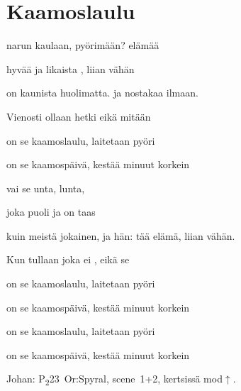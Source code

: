 \documentclass[12pt,a4paper]{article}
\begin{document}
\thispagestyle{empty}
\section*{Kaamoslaulu}


\begin{SBVerse}
 narun kaulaan,  pyörimään?
 elämää 

hyvää ja  likaista , liian vähän

 on kaunista  huolimatta.   ja
nostakaa  ilmaan.

Vienosti  ollaan hetki  eikä mitään
\end{SBVerse}

\begin{SBChorus}
 on se kaamoslaulu,  laitetaan
 pyöri

 on se kaamospäivä,  kestää 
minuut korkein
\end{SBChorus}

\begin{SBVerse}
  vai  se unta,
 lunta,

joka  puoli ja on taas 

 kuin meistä jokainen,  ja hän:  tää
elämä,  liian vähän.

Kun tullaan  joka ei , eikä se 
\end{SBVerse}

\begin{SBChorus}
 on se kaamoslaulu,  laitetaan
 pyöri

 on se kaamospäivä,  kestää 
minuut korkein

    
   

 on se kaamoslaulu,  laitetaan
 pyöri

 on se kaamospäivä,  kestää 
minuut korkein
\end{SBChorus}


{\SBLyricNoteFont Johan: P\textsubscript{2}23~Or:Spyral, scene~1+2, kertsissä
mod$\uparrow$.}
\end{document}
